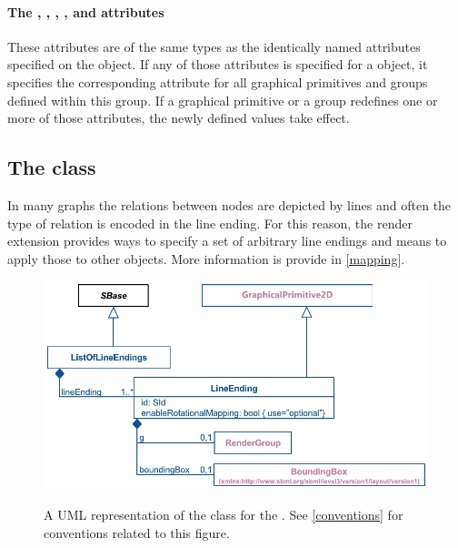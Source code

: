 \paragraph{The \fixttspace{}, \fixttspace{}, \fixttspace{} , \fixttspace{},  \fixttspace{} and \fixttspace{} attributes}

These attributes are of the same types as the identically named attributes specified on the \Text object.   If any of those attributes is specified for a \RenderGroup object, it 
specifies the corresponding attribute for all graphical primitives and groups 
defined within this group. If a graphical primitive or a group redefines one or 
more of those attributes, the newly defined values take effect.

\subsection{The  class}
\label{lineending-class}

In many graphs the relations between nodes are depicted by lines and often the 
type of relation is encoded in the line ending. For this reason, the render
extension provides ways to specify a set of arbitrary line endings and means to
apply those to other objects. More information is provide in \ref{mapping}.

\begin{figure}[!h]
  \centering
  \includegraphics{images/render-line-endings-uml}\\
  \caption{A UML representation of the \LineEnding class for the \RenderPackage.  See \ref{conventions} for conventions related to this figure. }
  \label{fig:line_ending_render_uml}
\end{figure}


